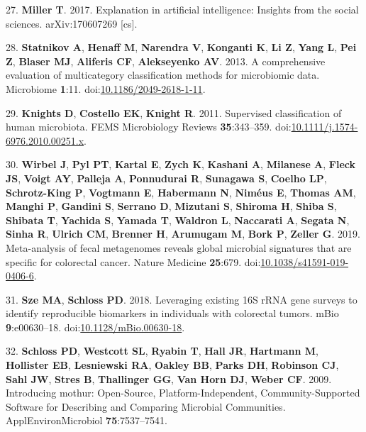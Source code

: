 \documentclass[11pt,]{article}
\begin{document}
\hypertarget{ref-miller_explanation_2017}{}
27. \textbf{Miller T}. 2017. Explanation in artificial intelligence:
Insights from the social sciences. arXiv:170607269 {[}cs{]}.

\hypertarget{ref-statnikov_comprehensive_2013}{}
28. \textbf{Statnikov A}, \textbf{Henaff M}, \textbf{Narendra V},
\textbf{Konganti K}, \textbf{Li Z}, \textbf{Yang L}, \textbf{Pei Z},
\textbf{Blaser MJ}, \textbf{Aliferis CF}, \textbf{Alekseyenko AV}. 2013.
A comprehensive evaluation of multicategory classification methods for
microbiomic data. Microbiome \textbf{1}:11.
doi:\href{https://doi.org/10.1186/2049-2618-1-11}{10.1186/2049-2618-1-11}.

\hypertarget{ref-knights_supervised_2011}{}
29. \textbf{Knights D}, \textbf{Costello EK}, \textbf{Knight R}. 2011.
Supervised classification of human microbiota. FEMS Microbiology Reviews
\textbf{35}:343--359.
doi:\href{https://doi.org/10.1111/j.1574-6976.2010.00251.x}{10.1111/j.1574-6976.2010.00251.x}.

\hypertarget{ref-wirbel_meta-analysis_2019}{}
30. \textbf{Wirbel J}, \textbf{Pyl PT}, \textbf{Kartal E}, \textbf{Zych
K}, \textbf{Kashani A}, \textbf{Milanese A}, \textbf{Fleck JS},
\textbf{Voigt AY}, \textbf{Palleja A}, \textbf{Ponnudurai R},
\textbf{Sunagawa S}, \textbf{Coelho LP}, \textbf{Schrotz-King P},
\textbf{Vogtmann E}, \textbf{Habermann N}, \textbf{Niméus E},
\textbf{Thomas AM}, \textbf{Manghi P}, \textbf{Gandini S},
\textbf{Serrano D}, \textbf{Mizutani S}, \textbf{Shiroma H},
\textbf{Shiba S}, \textbf{Shibata T}, \textbf{Yachida S}, \textbf{Yamada
T}, \textbf{Waldron L}, \textbf{Naccarati A}, \textbf{Segata N},
\textbf{Sinha R}, \textbf{Ulrich CM}, \textbf{Brenner H},
\textbf{Arumugam M}, \textbf{Bork P}, \textbf{Zeller G}. 2019.
Meta-analysis of fecal metagenomes reveals global microbial signatures
that are specific for colorectal cancer. Nature Medicine
\textbf{25}:679.
doi:\href{https://doi.org/10.1038/s41591-019-0406-6}{10.1038/s41591-019-0406-6}.

\hypertarget{ref-sze_leveraging_2018}{}
31. \textbf{Sze MA}, \textbf{Schloss PD}. 2018. Leveraging existing 16S
rRNA gene surveys to identify reproducible biomarkers in individuals
with colorectal tumors. mBio \textbf{9}:e00630--18.
doi:\href{https://doi.org/10.1128/mBio.00630-18}{10.1128/mBio.00630-18}.

\hypertarget{ref-schloss_introducing_2009}{}
32. \textbf{Schloss PD}, \textbf{Westcott SL}, \textbf{Ryabin T},
\textbf{Hall JR}, \textbf{Hartmann M}, \textbf{Hollister EB},
\textbf{Lesniewski RA}, \textbf{Oakley BB}, \textbf{Parks DH},
\textbf{Robinson CJ}, \textbf{Sahl JW}, \textbf{Stres B},
\textbf{Thallinger GG}, \textbf{Van Horn DJ}, \textbf{Weber CF}. 2009.
Introducing mothur: Open-Source, Platform-Independent,
Community-Supported Software for Describing and Comparing Microbial
Communities. ApplEnvironMicrobiol \textbf{75}:7537--7541.
\end{document}
